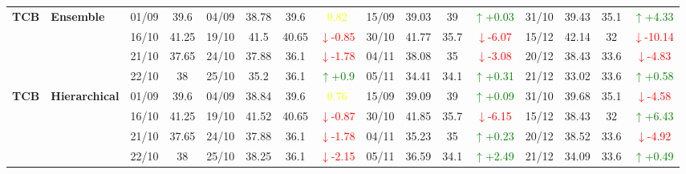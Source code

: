 \documentclass{ieeeaccess}
\begin{document}
{\begin{longtable}{llcc|cccc|cccc|cccc}
\multirow{4}{*}{\textbf{TCB}} 
& \textbf{Ensemble}
& 01/09 & 39.6 & 04/09 & 38.78 & 39.6 & \textcolor{yellow}{0.82} & 15/09 & 39.03 & 39 & \textcolor{green}{\(\uparrow\)+0.03} & 31/10 & 39.43 & 35.1 & \textcolor{green}{\(\uparrow\)+4.33} \\

&
& 16/10 & 41.25 & 19/10 & 41.5 & 40.65 & \textcolor{red}{\(\downarrow\)-0.85} & 30/10 & 41.77 & 35.7 & \textcolor{red}{\(\downarrow\)-6.07} & 15/12 & 42.14 & 32 & \textcolor{red}{\(\downarrow\)-10.14} \\

&
& 21/10 & 37.65 & 24/10 & 37.88 & 36.1 & \textcolor{red}{\(\downarrow\)-1.78} & 04/11 & 38.08 & 35 & \textcolor{red}{\(\downarrow\)-3.08} & 20/12 & 38.43 & 33.6 &\textcolor{red}{\(\downarrow\)-4.83}\\

&
& 22/10 & 38 & 25/10 & 35.2 & 36.1 & \textcolor{green}{\(\uparrow\)+0.9} & 05/11 & 34.41 & 34.1 & \textcolor{green}{\(\uparrow\)+0.31} & 21/12 & 33.02 & 33.6 & \textcolor{green}{\(\uparrow\)+0.58} \\
\midrule


\multirow{4}{*}{\textbf{TCB}} 
& \textbf{Hierarchical}
& 01/09 & 39.6 & 04/09 & 38.84 & 39.6 & \textcolor{yellow}{0.76} & 15/09 & 39.09 & 39 & \textcolor{green}{\(\uparrow\)+0.09} & 31/10 & 39.68 & 35.1 & \textcolor{red}{\(\downarrow\)-4.58} \\

&
& 16/10 & 41.25 & 19/10 & 41.52 & 40.65 & \textcolor{red}{\(\downarrow\)-0.87} & 30/10 & 41.85 & 35.7 & \textcolor{red}{\(\downarrow\)-6.15} & 15/12 & 38.43 & 32 & \textcolor{green}{\(\uparrow\)+6.43} \\

&
& 21/10 & 37.65 & 24/10 & 37.88 & 36.1 & \textcolor{red}{\(\downarrow\)-1.78} & 04/11 & 35.23 & 35 & \textcolor{green}{\(\uparrow\)+0.23} & 20/12 & 38.52 & 33.6 &\textcolor{red}{\(\downarrow\)-4.92}\\

&
& 22/10 & 38 & 25/10 & 38.25 & 36.1 & \textcolor{red}{\(\downarrow\)-2.15} & 05/11 & 36.59 & 34.1 & \textcolor{green}{\(\uparrow\)+2.49} & 21/12 & 34.09 & 33.6 & \textcolor{green}{\(\uparrow\)+0.49} \\
\midrule




\end{longtable}}
\end{document}
